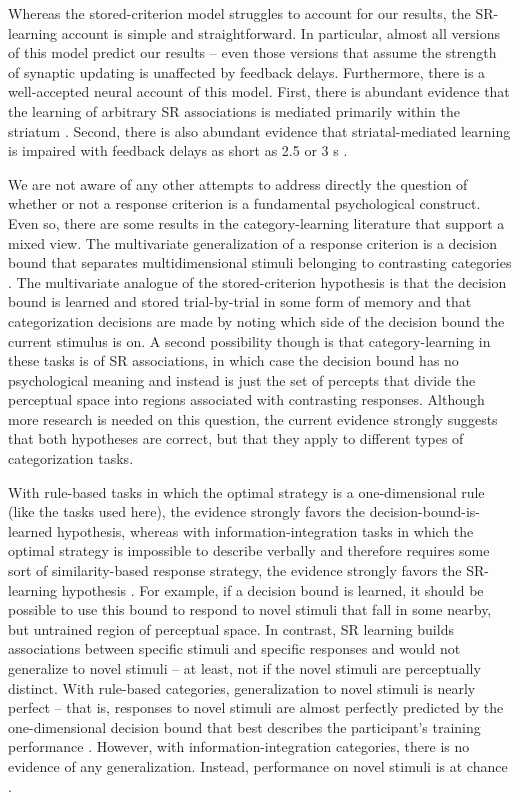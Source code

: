 \documentclass[doc, floatsintext]{apa7}
\begin{document}
Whereas the stored-criterion model struggles to  account for
our results, the SR-learning account  is simple and
straightforward. In particular, almost all versions of this
model predict our results -- even those versions that assume
the strength of synaptic updating is unaffected by feedback
delays. Furthermore, there is a well-accepted neural account
of this model. First, there is abundant evidence that the
learning of arbitrary SR associations is mediated primarily
within the striatum \parencite[e.g.,][]{Horvitz2009,
PackardMcGaugh1992}. Second, there is also abundant evidence
that striatal-mediated learning is impaired with feedback
delays as short as 2.5 or 3 s
\parencite{MaddoxAshbyBohil2003, MaddoxIng2005,
YagishitaEtAl2014}.

We are not aware of any other attempts to address directly
the question of whether or not a response criterion is a
fundamental psychological construct. Even so, there are some
results in the category-learning literature that support a
mixed view. The multivariate generalization of a response
criterion is a decision bound that separates
multidimensional stimuli belonging to contrasting categories
\parencite[e.g.,][]{AshbyGott1988}. The multivariate
analogue of the stored-criterion hypothesis is that the
decision bound is learned and stored trial-by-trial in some
form of memory and that categorization decisions are made by
noting which side of the decision bound the current stimulus
is on. A second possibility though is that category-learning
in these tasks is of SR associations, in which case the
decision bound has no psychological meaning and instead is
just the set of percepts that divide the perceptual space
into regions associated with contrasting responses. Although
more research is needed on this question, the current
evidence strongly suggests that both hypotheses are correct,
but that they apply to different types of categorization
tasks.

With rule-based tasks in which the optimal strategy is a
one-dimensional rule (like the tasks used here), the
evidence strongly favors the decision-bound-is-learned
hypothesis, whereas with information-integration tasks in
which the optimal strategy is impossible to describe
verbally and therefore requires some sort of
similarity-based response strategy, the evidence strongly
favors the SR-learning hypothesis
\parencite{AshbyWaldron1999, CasaleEtAl2012}. For example,
if a decision bound is learned, it should be possible to use
this bound to respond to novel stimuli that fall in some
nearby, but untrained region of perceptual space. In
contrast, SR learning builds associations between specific
stimuli and specific responses and would not generalize to
novel stimuli -- at least, not if the novel stimuli are
perceptually distinct. With rule-based categories,
generalization to novel stimuli is nearly perfect -- that
is, responses to novel stimuli are almost perfectly
predicted by the one-dimensional decision bound that best
describes the participant's training performance
\parencite{CasaleEtAl2012}. However, with
information-integration categories, there is no evidence of
any generalization. Instead, performance on novel stimuli is
at chance \parencite{CasaleEtAl2012}. 
\end{document}
